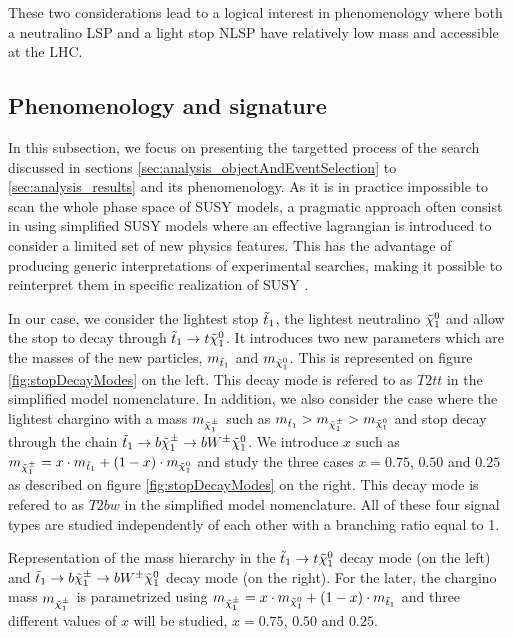         These two considerations lead to a logical interest in phenomenology where both a 
        neutralino LSP and a light stop NLSP have relatively low mass and accessible at the LHC.

        \subsection{Phenomenology and signature}

        In this subsection, we focus on presenting the targetted process of the search discussed 
        in sections \ref{sec:analysis_objectAndEventSelection} to \ref{sec:analysis_results} and 
        its phenomenology. As it is in practice impossible to scan the whole phase space of SUSY
        models, a pragmatic approach often consist in using simplified SUSY models where an 
        effective lagrangian is introduced to consider a limited set of new physics features. 
        This has the advantage of producing generic interpretations of experimental searches, 
        making it possible to reinterpret them in specific realization of SUSY \cite{SusySimplifiedModels, SmodelS}.

        In our case, we consider the lightest stop $\tilde{t}_1$, the lightest neutralino 
        $\tilde{\chi}_1^0$ and allow the stop to decay through $\tilde{t}_1 \rightarrow t \tilde{\chi}_1^0$. 
        It introduces two new parameters which are the masses of the new particles, $m_{\tilde{t}_1}$ 
        and $m_{\tilde{\chi}_1^0}$. This is represented on figure \ref{fig:stopDecayModes} on the left. 
        This decay mode is refered to as $T2tt$ in the simplified model nomenclature. In addition, 
        we also consider the case where the lightest chargino with a mass $m_{\tilde{\chi}_1^\pm}$ such 
        as $m_{\tilde{t}_1} > m_{\tilde{\chi}_1^\pm} > m_{\tilde{\chi}_1^0}$ and stop decay through the 
        chain $\tilde{t}_1 \rightarrow b \tilde{\chi}_1^\pm \rightarrow b W^{\pm} \tilde{\chi}_1^0$. We introduce 
        $x$ such as $m_{\tilde{\chi}_1^\pm} = x \cdot m_{\tilde{t}_1} + (1 - x) \cdot m_{\tilde{\chi}_1^0}$ 
        and study the three cases $x = 0.75$, $0.50$ and $0.25$ as described on figure \ref{fig:stopDecayModes} 
        on the right. This decay mode is refered to as $T2bw$ in the simplified model nomenclature. 
        All of these four signal types are studied independently of each other with a branching ratio 
        equal to 1.

                     {Representation of the mass hierarchy in the $\tilde{t}_1 \rightarrow t \tilde{\chi}_1^0$ 
                     decay mode (on the left) and $\tilde{t}_1 \rightarrow b \tilde{\chi}_1^\pm \rightarrow b W^{\pm} 
                     \tilde{\chi}_1^0 $ decay mode (on the right). For the later, the chargino mass $m_{\tilde{\chi}_1^\pm}$ 
                     is parametrized using $m_{\tilde{\chi}_1^\pm} = x \cdot m_{\tilde{\chi}_1^0} + (1 - x) \cdot m_{\tilde{t}_1}$ 
                     and three different values of $x$ will be studied, $x = 0.75$, $0.50$ and $0.25$.} 
    
